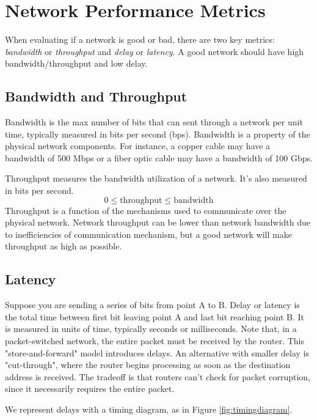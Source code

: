\section{Network Performance Metrics}

When evaluating if a network is good or bad, there are two key metrics:
\emph{bandwidth} or \emph{throughput} and \emph{delay} or \emph{latency}.
A good network should have high bandwidth/throughput and low delay.

\subsection{Bandwidth and Throughput}
Bandwidth is the max number of bits that can sent through a network
per unit time, typically measured in bits per second (bps).
Bandwidth is a property of the physical network components. For instance,
a copper cable may have a bandwidth of 500 Mbps or a fiber optic cable
may have a bandwidth of 100 Gbps.


Throughput measures the bandwidth utilization of a network. It's also
measured in bits per second.
\begin{equation}
    0 \leq \text{throughput} \leq \text{bandwidth}
\end{equation}
Throughput is a function of the mechanisms used to communicate over the
physical network. Network throughput can be lower than network bandwidth
due to inefficiencies of communication mechanism, but a good network
will make throughput as high as possible.

\subsection{Latency}
Suppose you are sending a series of bits from point A to B. Delay or
latency is the total time between first bit leaving point A and last
bit reaching point B. It is measured in units of time, typically seconds
or milliseconds.
Note that, in a packet-switched network, the entire packet must be
received by the router. This "store-and-forward" model introduces
delays. An alternative with smaller delay is "cut-through", where
the router begins processing as soon as the destination address is
received. The tradeoff is that routers can't check for packet
corruption, since it necessarily requires the entire packet.

We represent delays with a timing diagram, as in Figure \ref{fig:timingdiagram}.

